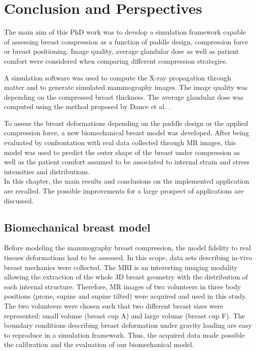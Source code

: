 
\chapter{Conclusion and Perspectives}\label{section:generalconclusion}


The main aim of this PhD work was to develop a simulation framework capable of assessing breast compression as a function of paddle design, compression force or breast positioning. Image quality, average glandular dose as well as patient comfort were considered when comparing different compression strategies.

 A simulation software was used to compute the X-ray propagation through matter and to generate simulated mammography images. The image quality was depending on the compressed breast thickness. The average glandular dose was computed using the method proposed by Dance et al. \citep{dance_additional_2000}. 
 
 To assess the breast deformations depending on the paddle design or the applied compression force, a new biomechanical breast model was developed. After being evaluated by confrontation with real data collected through MR images, this model was used to predict the outer shape of the breast under compression as well as	 the patient comfort assumed to be associated to internal strain and stress intensities and distributions.\\
 
 
 
 In this chapter, the main results and conclusions on the implemented application are recalled. The possible improvements for a large prospect of applications are discussed. 
 \clearpage
 \section{Biomechanical breast model }
  Before modeling the mammography breast compression, the model fidelity to real tissues deformations had to be assessed. In this  scope, data sets describing in-vivo breast mechanics were collected. The MRI is an interesting imaging modality allowing the extraction of the whole 3D breast geometry with the distribution of each internal structure.  Therefore, MR images of two volunteers in three body positions (prone, supine and supine tilted) were acquired and used in this study. The two volunteers were chosen such that two different breast sizes were represented: small volume (breast cup A) and large volume (breast cup F). The boundary conditions describing breast deformation under gravity loading are easy to reproduce in a simulation framework. Thus, the acquired data made possible the calibration and the evaluation of our biomechanical model.
   
